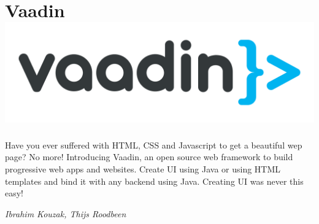 \section*{Vaadin\hfill\includegraphics[width=.35\linewidth]{images/Vaadin.png}}

Have you ever suffered with HTML, CSS and Javascript to get a beautiful wep page? No more! Introducing Vaadin, an open source web framework to build progressive web apps and websites. Create UI using Java or using HTML templates and bind it with any backend using Java. Creating UI was never this easy!

\hfill\textit{Ibrahim Kouzak, Thijs Roodbeen}
